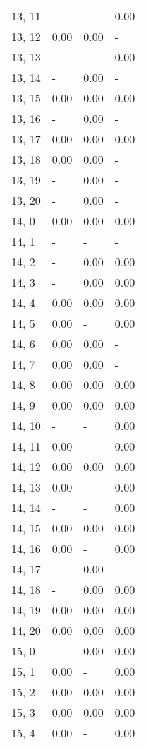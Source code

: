 \begin{table}
\begin{tabular}{llll}
13, 11 &     - &     - &  0.00 \\
13, 12 &  0.00 &  0.00 &     - \\
13, 13 &     - &     - &  0.00 \\
13, 14 &     - &  0.00 &     - \\
13, 15 &  0.00 &  0.00 &  0.00 \\
13, 16 &     - &  0.00 &     - \\
13, 17 &  0.00 &  0.00 &  0.00 \\
13, 18 &  0.00 &  0.00 &     - \\
13, 19 &     - &  0.00 &     - \\
13, 20 &     - &  0.00 &     - \\
14, 0  &  0.00 &  0.00 &  0.00 \\
14, 1  &     - &     - &     - \\
14, 2  &     - &  0.00 &  0.00 \\
14, 3  &     - &  0.00 &  0.00 \\
14, 4  &  0.00 &  0.00 &  0.00 \\
14, 5  &  0.00 &     - &  0.00 \\
14, 6  &  0.00 &  0.00 &     - \\
14, 7  &  0.00 &  0.00 &     - \\
14, 8  &  0.00 &  0.00 &  0.00 \\
14, 9  &  0.00 &  0.00 &  0.00 \\
14, 10 &     - &     - &  0.00 \\
14, 11 &  0.00 &     - &  0.00 \\
14, 12 &  0.00 &  0.00 &  0.00 \\
14, 13 &  0.00 &     - &  0.00 \\
14, 14 &     - &     - &  0.00 \\
14, 15 &  0.00 &  0.00 &  0.00 \\
14, 16 &  0.00 &     - &  0.00 \\
14, 17 &     - &  0.00 &     - \\
14, 18 &     - &  0.00 &  0.00 \\
14, 19 &  0.00 &  0.00 &  0.00 \\
14, 20 &  0.00 &  0.00 &  0.00 \\
15, 0  &     - &  0.00 &  0.00 \\
15, 1  &  0.00 &     - &  0.00 \\
15, 2  &  0.00 &  0.00 &  0.00 \\
15, 3  &  0.00 &  0.00 &  0.00 \\
15, 4  &  0.00 &     - &  0.00 \\

\end{tabular}
\end{table}
